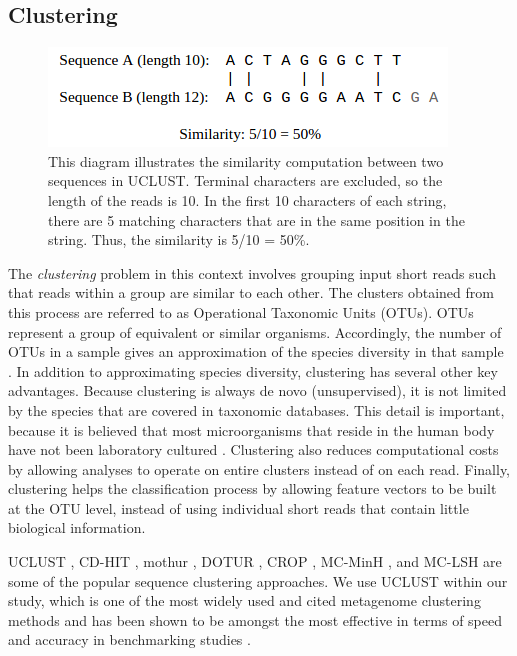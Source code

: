 \subsection{Clustering}

\begin{figure}[h]
\centering
\includegraphics[scale=0.5]{./uclust-similarity.png}
\caption{This diagram illustrates the similarity computation between two sequences in UCLUST. Terminal characters are excluded, so the length of the reads is 10. In the first 10 characters of each string, there are 5 matching characters that are in the same position in the string. Thus, the similarity is 5/10 = 50\%.} \label{uclust-similarity}
\end{figure}

The \emph{clustering} problem in this context  involves grouping input short reads  such that reads within a group are similar to each other. The clusters obtained from this process are referred to as Operational Taxonomic Units (OTUs). OTUs represent a group of equivalent or similar organisms. Accordingly, the number of OTUs in a sample gives an approximation of the species diversity in that sample  \cite{schloss2009introducing,schloss2005introducing,sun2009esprit}.
In addition to approximating species diversity, clustering has several other key advantages. Because clustering is always de novo (unsupervised), it is not limited by the species that are covered in taxonomic databases. This detail is important, because it is believed that most microorganisms that reside in the human body have not been laboratory cultured \cite{handelsman04}. Clustering also reduces computational costs by allowing analyses to operate on entire clusters instead of on each read. Finally, clustering helps the classification process by allowing feature vectors to be built at the OTU level, instead of using individual short reads that contain little biological information.

UCLUST \cite{Edgar10}, CD-HIT \cite{Li01072006}, mothur \cite{schloss2009introducing}, DOTUR \cite{schloss2005introducing}, CROP \cite{Hao01032011}, MC-MinH \cite{sdm2013a}, and 
MC-LSH \cite{bibm2012} are some of the popular sequence clustering approaches. We use UCLUST within our study, which is one of the most widely used and cited metagenome clustering methods and has been shown to be amongst the most effective in terms of speed and accuracy in benchmarking studies \cite{bonder090112, sun042711}. 
%

